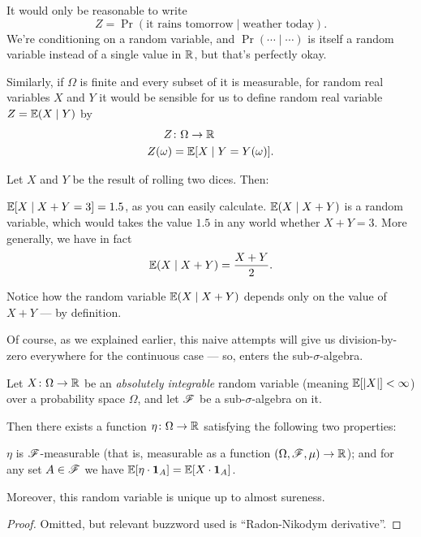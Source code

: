 It would only be reasonable to write
\[ Z = \Pr(\text{it rains tomorrow}\mid \text{weather today}). \]
We're conditioning on a random variable, and $\Pr(\cdots \mid \cdots)$ is itself a random variable
instead of a single value in $\mathbb R$, but that's perfectly okay.

Similarly, if $\Omega$ is finite and every subset of it is measurable,
for random real variables $X$ and $Y$
it would be sensible for us to define random real variable $Z = \mathbb E(X \mid Y)$ by
\begin{align*}
	Z &\colon \Omega \to \mathbb R \\
	Z(\omega) &= \mathbb E[X \mid Y = Y(\omega)].
\end{align*}

\begin{example}
	Let $X$ and $Y$ be the result of rolling two dices. Then:
	\begin{itemize}
		\ii $\mathbb E[X \mid X+Y = 3] = 1.5$, as you can easily calculate.
		\ii $\mathbb E(X \mid X+Y)$ is a random variable, which would takes the value
		$1.5$ in any world whether $X+Y = 3$.
		\ii More generally, we have in fact
		\[ \mathbb E(X \mid X+Y) = \frac{X+Y}{2}. \]
	\end{itemize}
	Notice how the random variable $\mathbb E(X \mid X+Y)$ depends only on the value of $X+Y$ --- by
	definition.
\end{example}

Of course, as we explained earlier, this naive attempts will give us division-by-zero
everywhere for the continuous case --- so, enters the sub-$\sigma$-algebra.

\begin{proposition}
	\label{prop:conditional_exp}
	Let $X \colon \Omega \to \mathbb R$ be an \emph{absolutely integrable}
	random variable (meaning $\mathbb E[|X|] < \infty$)
	over a probability space $\Omega$,
	and let $\mathscr F$ be a sub-$\sigma$-algebra on it.

	Then there exists a function $\eta \colon \Omega \to \mathbb R$
	satisfying the following two properties:
	\begin{itemize}
		\ii $\eta$ is $\mathscr F$-measurable (that is,
			measurable as a function $(\Omega, \mathscr F, \mu) \to \mathbb R$); and
		\ii for any set $A \in \mathscr F$ we have
		$\mathbb E[\eta \cdot \mathbf{1}_A] = \mathbb E[X \cdot \mathbf{1}_A]$.
	\end{itemize}
	Moreover, this random variable is unique up to almost sureness.
\end{proposition}
\begin{proof}
	Omitted, but relevant buzzword used is ``Radon-Nikodym derivative''.
\end{proof}

